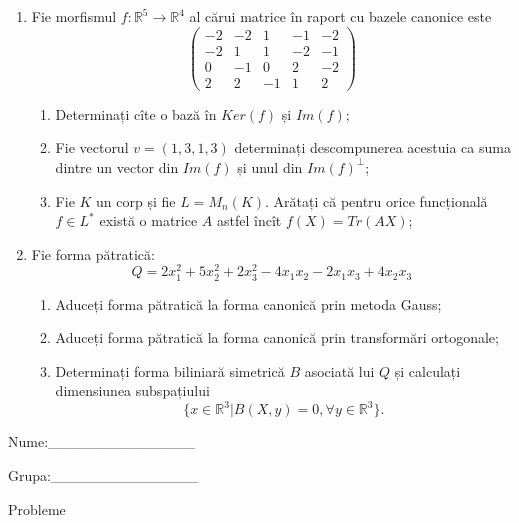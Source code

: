 \documentclass{article}
\begin{document}
\begin{enumerate}
 \item Fie morfismul $f:\mathbb{R}^5 \to \mathbb{R}^4$ al cărui matrice în raport cu bazele canonice este
$$\begin{pmatrix}
-2&-2&1&-1&-2\\
-2&1&1&-2&-1\\
0&-1&0&2&-2\\
2&2&-1&1&2
\end{pmatrix}$$

\begin{enumerate}
\item Determinați cîte o bază în $Ker(f)$ și $Im(f)$;
\item Fie vectorul $v=(1,3,1,3)$ determinați descompunerea acestuia ca suma dintre un vector din $Im(f)$ și unul din $Im(f)^\perp$;
\item Fie $K$ un corp și fie $L=M_n(K)$. Arătați că pentru orice funcțională $f \in L^*$ există o matrice $A$ astfel încît $f(X)=Tr(AX)$;
\end{enumerate}
\item Fie forma pătratică:
$$Q= 2x_1^2+5x_2^2+2x_3^2-4x_1x_2-2x_1x_3+4x_2x_3$$

\begin{enumerate}
\item Aduceți forma pătratică la forma canonică prin metoda Gauss;
\item Aduceți forma pătratică la forma canonică prin transformări ortogonale;
\item Determinați forma biliniară simetrică $B$ asociată lui $Q$ și calculați dimensiunea subspațiului
$$\{x \in \mathbb{R}^3 | B(X,y)=0,\forall y \in \mathbb{R}^3\}.$$

\end{enumerate}
\end{enumerate}
\newpage
\begin{flushright}
Nume:\_\_\_\_\_\_\_\_\_\_\_\_\_\_
 
 
Grupa:\_\_\_\_\_\_\_\_\_\_\_\_\_\_
\end{flushright}
\begin{center}
\vspace{2cm}
{\Large Probleme}
\vspace{2cm}
\end{center}
\end{document}
